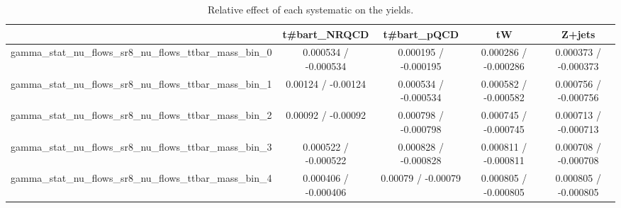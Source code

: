 \documentclass[10pt]{article}
\begin{document}
\begin{table}[htbp]
\begin{center}
\begin{tabular}{|c|c|c|c|c|}
\hline 
      & t#bar{t}_{NRQCD}      & t#bar{t}_{pQCD}      & tW      & Z+jets \\ 
\hline 
  gamma_stat_nu_flows_sr8_nu_flows_ttbar_mass_bin_0 & 0.000534 / -0.000534 & 0.000195 / -0.000195 & 0.000286 / -0.000286 & 0.000373 / -0.000373 \\ 
  gamma_stat_nu_flows_sr8_nu_flows_ttbar_mass_bin_1 & 0.00124 / -0.00124 & 0.000534 / -0.000534 & 0.000582 / -0.000582 & 0.000756 / -0.000756 \\ 
  gamma_stat_nu_flows_sr8_nu_flows_ttbar_mass_bin_2 & 0.00092 / -0.00092 & 0.000798 / -0.000798 & 0.000745 / -0.000745 & 0.000713 / -0.000713 \\ 
  gamma_stat_nu_flows_sr8_nu_flows_ttbar_mass_bin_3 & 0.000522 / -0.000522 & 0.000828 / -0.000828 & 0.000811 / -0.000811 & 0.000708 / -0.000708 \\ 
  gamma_stat_nu_flows_sr8_nu_flows_ttbar_mass_bin_4 & 0.000406 / -0.000406 & 0.00079 / -0.00079 & 0.000805 / -0.000805 & 0.000805 / -0.000805 \\ 
\hline 
\end{tabular} 
\caption{Relative effect of each systematic on the yields.} 
\end{center} 
\end{table} 
\end{document}
